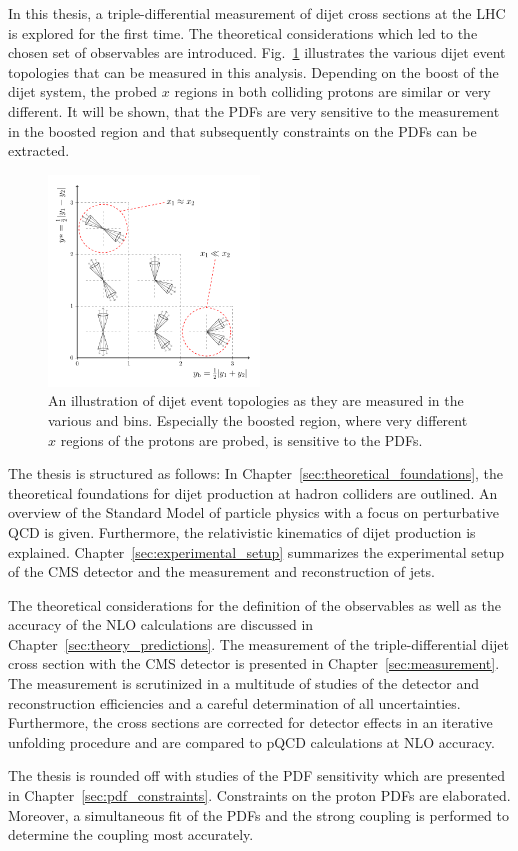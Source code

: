 In this thesis, a triple-differential measurement of dijet cross sections at the
LHC is explored for the first time. The theoretical considerations which led to
the chosen set of observables are introduced. Fig.~\ref{fig:intro_ybys_hint}
illustrates the various dijet event topologies that can be measured in this
analysis. Depending on the boost of the dijet system, the probed $x$ regions in
both colliding protons are similar or very different. It will be shown, that
the PDFs are very sensitive to the measurement in the boosted region and that
subsequently constraints on the PDFs can be extracted.
\\
\begin{figure}
    \centering
    \caption[Illustration of dijet topologies various \ystar and \yboost bins]{
             An illustration of dijet event topologies as they are measured in
             the various \ystar and \yboost bins. Especially the boosted region,
             where very different $x$ regions of the protons are probed, is
             sensitive to the PDFs.}
    \label{fig:intro_ybys_hint}
    \includegraphics[width=0.5\textwidth]{figures/drawings/ybys_hint.pdf}
\end{figure}

The thesis is structured as follows: In
Chapter~\ref{sec:theoretical_foundations}, the theoretical foundations for dijet
production at hadron colliders are outlined. An overview of the Standard Model
of particle physics with a focus on perturbative QCD is given.  Furthermore, the
relativistic kinematics of dijet production is explained.
Chapter~\ref{sec:experimental_setup} summarizes the experimental setup of the
CMS detector and the measurement and reconstruction of jets. 

The theoretical considerations for the definition of the observables as well as
the accuracy of the NLO calculations are discussed in
Chapter~\ref{sec:theory_predictions}. The measurement of the triple-differential
dijet cross section with the CMS detector is presented in
Chapter~\ref{sec:measurement}. The measurement is scrutinized in a multitude of
studies of the detector and reconstruction efficiencies and a careful
determination of all uncertainties. Furthermore, the cross sections are
corrected for detector effects in an iterative unfolding procedure and are
compared to pQCD calculations at NLO accuracy.

The thesis is rounded off with studies of the PDF sensitivity which are presented in
Chapter~\ref{sec:pdf_constraints}. Constraints on the proton PDFs
are elaborated. Moreover, a simultaneous fit of the PDFs and the strong coupling
is performed to determine the coupling most accurately.

